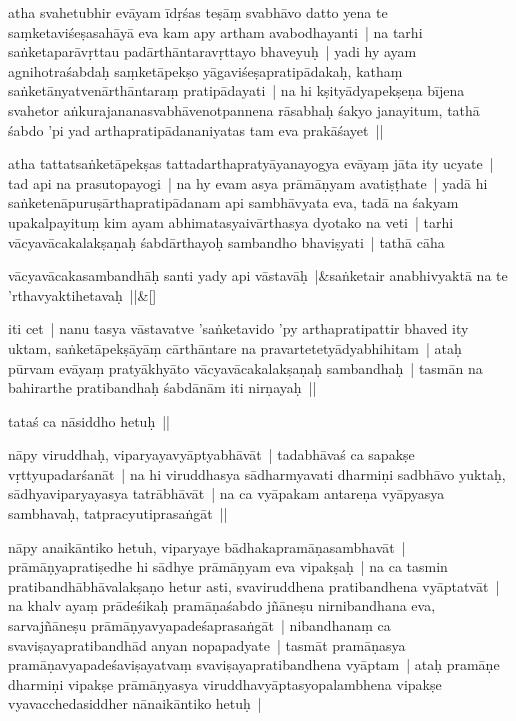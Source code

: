 \documentclass[article,a4paper]{memoir}
\begin{document}
	  \pstart atha svahetubhir evā\-yam ī\-dṛśas teṣā\-ṃ svabhā\-vo datto yena te saṃketaviśeṣasahā\-yā\- eva kam apy artham avabodhayanti | na tarhi saṅketaparā\-vṛttau padā\-rthā\-ntaravṛttayo bhaveyuḥ | yadi hy ayam agnihotraśabdaḥ saṃketā\-pekṣo yā\-gaviśeṣapratipā\-dakaḥ, kathaṃ saṅketā\-nyatvenā\-rthā\-ntaraṃ pratipā\-dayati | na hi kṣityā\-dyapekṣeṇa bī\-jena svahetor aṅkurajananasvabhā\-venotpannena rā\-sabhaḥ śakyo janayitum, tathā\- śabdo 'pi yad arthapratipā\-dananiyatas tam eva prakā\-śayet || 
	\pend
      

	  \pstart atha tattatsaṅketā\-pekṣas tattadarthapratyā\-yanayogya evā\-yaṃ jā\-ta ity ucyate | tad api na prasutopayogi | na hy evam asya prā\-mā\-ṇyam avatiṣṭhate | yadā\- hi saṅketenā\-puruṣā\-rthapratipā\-danam api sambhā\-vyata eva, tadā\- na śakyam upakalpayituṃ kim ayam abhimatasyaivā\-rthasya dyotako na veti | tarhi vā\-cyavā\-cakalakṣaṇaḥ śabdā\-rthayoḥ sambandho bhaviṣyati | tathā\- cā\-ha
	\pend
      
	    
	    \stanza[\smallbreak]
vā\-cyavā\-cakasambandhā\-ḥ santi yady api vā\-stavā\-ḥ |&saṅketair anabhivyaktā\- na te 'rthavyaktihetavaḥ ||\&[\smallbreak]


	

	  \pstart iti cet | nanu tasya vā\-stavatve 'saṅketavido 'py arthapratipattir bhaved ity uktam, saṅketā\-pekṣā\-yā\-ṃ cā\-rthā\-ntare na pravartetetyā\-dyabhihitam | ataḥ pū\-rvam evā\-yaṃ pratyā\-khyā\-to vā\-cyavā\-cakalakṣaṇaḥ sambandhaḥ | tasmā\-n na bahirarthe pratibandhaḥ śabdā\-nā\-m iti nirṇayaḥ ||
	\pend
      

	  \pstart tataś ca nā\-siddho hetuḥ ||
	\pend
      

	  \pstart nā\-py viruddhaḥ, viparyayavyā\-ptyabhā\-vā\-t | tadabhā\-vaś ca sapakṣe vṛttyupadarśanā\-t | na hi viruddhasya sā\-dharmyavati dharmiṇi sadbhā\-vo yuktaḥ, sā\-dhyaviparyayasya tatrā\-bhā\-vā\-t | na ca vyā\-pakam antareṇa vyā\-pyasya sambhavaḥ, tatpracyutiprasaṅgā\-t || 
	\pend
      

	  \pstart nā\-py anaikā\-ntiko hetuh, viparyaye bā\-dhakapramā\-ṇasambhavā\-t | prā\-mā\-ṇyapratiṣedhe hi sā\-dhye prā\-mā\-ṇyam eva vipakṣaḥ | na ca tasmin pratibandhā\-bhā\-valakṣaṇo hetur asti, svaviruddhena pratibandhena vyā\-ptatvā\-t | na khalv ayaṃ prā\-deśikaḥ pramā\-ṇaśabdo jñā\-neṣu nirnibandhana eva, sarvajñā\-neṣu prā\-mā\-ṇyavyapadeśaprasaṅgā\-t | nibandhanaṃ ca svaviṣayapratibandhā\-d anyan nopapadyate | tasmā\-t pramā\-ṇasya pramā\-ṇavyapadeśaviṣayatvaṃ svaviṣayapratibandhena vyā\-ptam | ataḥ pramā\-ṇe dharmiṇi vipakṣe prā\-mā\-ṇyasya viruddhavyā\-ptasyopalambhena vipakṣe vyavacchedasiddher nā\-naikā\-ntiko hetuḥ |
	\pend
      
\end{document}
